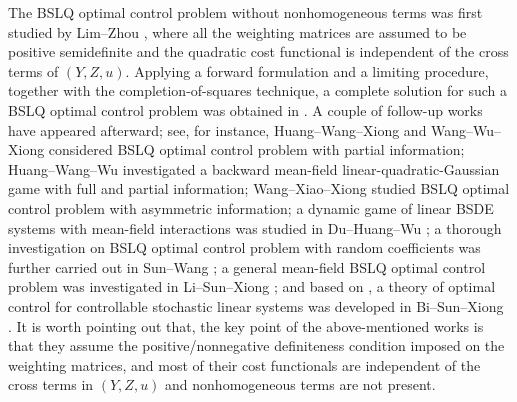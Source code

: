 \documentclass[11pt,times,twoside]{article}
\def\ms{\medskip}         \def\da{\mathop{\downarrow}}       \def\rt{\right}
\begin{document}
The BSLQ optimal control problem without nonhomogeneous terms was first studied by Lim--Zhou \cite{Lim-Zhou2001},
where all the weighting matrices are assumed to be positive semidefinite and the quadratic cost functional is
independent of the cross terms of $(Y,Z,u)$.
Applying a forward formulation and a limiting procedure, together with the completion-of-squares technique,
a complete solution for such a BSLQ optimal control problem was obtained in \cite{Lim-Zhou2001}.
A couple of follow-up works have appeared afterward; see, for instance, Huang--Wang--Xiong \cite{Huang-Wang-Xiong2009}
and Wang--Wu--Xiong \cite{Wang-Wu-Xiong2012} considered BSLQ optimal control problem with partial information;
Huang--Wang--Wu \cite{Huang-Wang-Wu2016} investigated a backward mean-field linear-quadratic-Gaussian game with
full and partial information;
%
Wang--Xiao--Xiong \cite{Wang-Xiao-Xiong2018} studied BSLQ optimal control problem with asymmetric information;
a dynamic game of linear BSDE systems with mean-field interactions was studied in Du--Huang--Wu \cite{Du-Huang-Wu2018};
a thorough investigation on BSLQ optimal control problem with random coefficients was further carried out
in Sun--Wang \cite{Sun-Wang2019};
a general mean-field BSLQ optimal control problem was investigated in Li--Sun--Xiong \cite{Li-Sun-Xiong2019};
and based on \cite{Li-Sun-Xiong2019,Lim-Zhou2001}, a theory of optimal control for controllable stochastic linear
systems was developed in Bi--Sun--Xiong \cite{Bi-Sun-Xiong2020}.
It is worth pointing out that, the key point of the above-mentioned works is that they assume the positive/nonnegative
definiteness condition imposed on the weighting matrices, and most of their cost functionals are independent
of the cross terms in $(Y,Z,u)$ and nonhomogeneous terms are not present.

\ms
\end{document}
